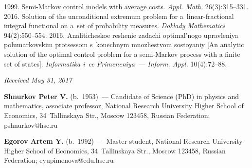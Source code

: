 \begin{multicols}{2}
{{\begin{thebibliography}{99}
   1999. Semi-Markov control 
models with average costs. \textit{Appl. Math.} 26(3):315--331.
   2016. Solution of the unconditional extremum problem for 
a~linear-fractional integral functional on a~set of probability measures. 
\textit{Doklady Mathematics} 94(2):550--554.
   2016. 
Analiticheskoe reshenie zadachi optimal'nogo upravleniya polumarkovskim 
protsessom s~konechnym mnozhestvom sostoyaniy [An analytic solution of the 
optimal control problem for a semi-Markov process with a finite set of states]. 
\textit{Informatika i~ee Primeneniya~--- Inform. Appl.} 10(4):72--88.

\end{thebibliography}

 }
 }

\end{multicols}

\vspace*{-6pt}

\hfill{\small\textit{Received May 31, 2017}}

\vspace*{-18pt}
  
  \Contr
  
  \noindent
  \textbf{Shnurkov Peter V.} (b.\ 1953)~--- Candidate of Science (PhD) in physics and 
mathematics, associate professor, National Research University Higher School of Economics, 
34~Tallinskaya Str., Moscow 123458, Russian Federation; \mbox{pshnurkov@hse.ru}
  
  
  \noindent
  \textbf{Egorov Artem Y.} (b.\ 1992)~--- Master student, National Research University 
Higher School of Economics, 34~Tallinskaya Str., Moscow 123458, Russian Federation; 
\mbox{eyupimenova@edu.hse.ru}

  
\label{end\stat}


\renewcommand{\bibname}{\protect\rm Литература} 